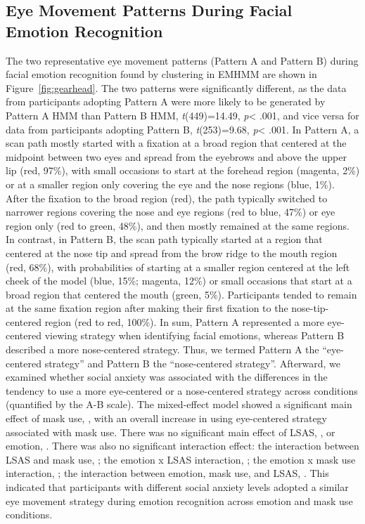 \subsection{Eye Movement Patterns During Facial Emotion Recognition}
The two representative eye movement patterns (Pattern A and Pattern B) during facial emotion recognition found by clustering in EMHMM are shown in Figure~\ref{fig:gearhead}. The two patterns were significantly different, as the data from participants adopting Pattern A were more likely to be generated by Pattern A HMM than Pattern B HMM, \textit{t}(449)=14.49, \textit{p}< .001, and vice versa for data from participants adopting Pattern B, \textit{t}(253)=9.68, \textit{p}< .001. In Pattern A, a scan path mostly started with a fixation at a broad region that centered at the midpoint between two eyes and spread from the eyebrows and above the upper lip (red, 97\%), with small occasions to start at the forehead region (magenta, 2\%) or at a smaller region only covering the eye and the nose regions (blue, 1\%). After the fixation to the broad region (red), the path typically switched to narrower regions covering the nose and eye regions (red to blue, 47\%) or eye region only (red to green, 48\%), and then mostly remained at the same regions. In contrast, in Pattern B, the scan path typically started at a region that centered at the nose tip and spread from the brow ridge to the mouth region (red, 68\%), with probabilities of starting at a smaller region centered at the left cheek of the model (blue, 15\%; magenta, 12\%) or small occasions that start at a broad region that centered the mouth (green, 5\%). Participants tended to remain at the same fixation region after making their first fixation to the nose-tip-centered region (red to red, 100\%).  In sum, Pattern A represented a more eye-centered viewing strategy when identifying facial emotions, whereas Pattern B described a more nose-centered strategy. Thus, we termed Pattern A the “eye-centered strategy” and Pattern B the “nose-centered strategy”. Afterward, we examined whether social anxiety was associated with the differences in the tendency to use a more eye-centered or a nose-centered strategy across conditions (quantified by the A-B scale).
The mixed-effect model showed a significant main effect of mask use, , with an overall increase in using eye-centered strategy associated with mask use. There was no significant main effect of LSAS, , or emotion, . There was also no significant interaction effect: the interaction between LSAS and mask use, ; the emotion x LSAS interaction, ; the emotion x mask use interaction, ; the interaction between emotion, mask use, and LSAS, . This indicated that participants with different social anxiety levels adopted a similar eye movement strategy during emotion recognition across emotion and mask use conditions. 
